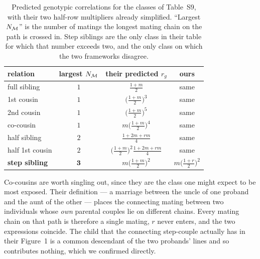 \documentclass[12pt]{article}
\begin{document}
\begin{table}[H]
    \begin{floatcard}
    \renewcommand{\arraystretch}{2.2}
    \setlength{\tabcolsep}{5pt}
    \small
    \begin{tabular}{l|c|c|c}
        relation
            & largest $N_{\mathcal{M}}$
            & their predicted $r_g$
            & ours \\
        \hline
        full sibling
            & $1$ & $\tfrac{1+m}{2}$ & same \\
        1st cousin
            & $1$ & $\big(\tfrac{1+m}{2}\big)^{3}$ & same \\
        2nd cousin
            & $1$ & $\big(\tfrac{1+m}{2}\big)^{5}$ & same \\
        co-cousin
            & $1$ & $m\big(\tfrac{1+m}{2}\big)^{4}$ & same \\
        half sibling
            & $2$ & $\tfrac{1+2m+rm}{4}$ & same \\
        half 1st cousin
            & $2$ & $\big(\tfrac{1+m}{2}\big)^{2}\tfrac{1+2m+rm}{4}$ & same \\
        \hline
        \textbf{step sibling}
            & $\mathbf{3}$ & $m\big(\tfrac{1+m}{2}\big)^{2}$
            & $m\big(\tfrac{1+r}{2}\big)^{2}$ \\
    \end{tabular}
    \caption{%
        Predicted genotypic correlations for the classes of \citet{Eftedal2025PNAS} Table~S9, with their two half-row multipliers already simplified.
        ``Largest $N_{\mathcal{M}}$'' is the number of matings the longest mating chain on the path is crossed in.
        Step siblings are the only class in their table for which that number exceeds two, and the only class on which the two frameworks disagree.%
    }
    \label{tab:eftedal}
    \end{floatcard}
\end{table}

Co-cousins are worth singling out, since they are the class one might expect to be most exposed.
Their definition --- a marriage between the uncle of one proband and the aunt of the other --- places the connecting mating between two individuals whose \emph{own} parental couples lie on different chains.
Every mating chain on that path is therefore a single mating, $r$ never enters, and the two expressions coincide.
The child that the connecting step-couple actually has in their Figure~1 is a common descendant of the two probands' lines and so contributes nothing, which we confirmed directly.
\end{document}

